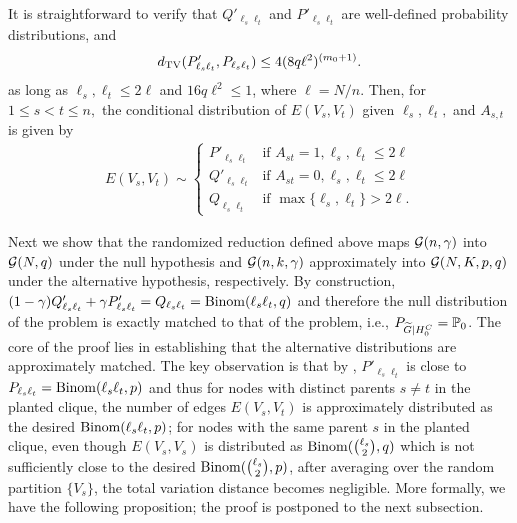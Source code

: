 It is straightforward to verify that $Q'_{\ell_s \ell_t}$ and $P'_{\ell_s \ell_t}$ are well-defined probability distributions, and
\begin{align}
d_{\rm TV} ( P'_{\ell_s \ell_t}, P_{\ell_s\ell_t} ) \le  4 (8q \ell^2)^{(m_0+1)}. \label{eq:TV_bound}
\end{align}
as long as $\ell_s, \ell_t \le 2 \ell$ and $16 q \ell^2 \le 1$, where $\ell=N/n$.  
Then, for $1\leq s < t \leq n,$ the conditional distribution of $E(V_s,V_t)$ given $\ell_s,\ell_t,$ and $A_{s,t}$ is given by
    \begin{align}
    E(V_s, V_t) \sim \left\{
    \begin{array}{rl}
    P'_{\ell_s \ell_t} & \text{if } A_{st}=1, \ell_s, \ell_t \le 2\ell\\
    Q'_{\ell_s \ell_t} & \text{if } A_{st}=0, \ell_s, \ell_t \le 2 \ell \\
    Q_{\ell_s \ell_t} & \text{if } \max\{ \ell_s, \ell_t \}> 2 \ell.
    \end{array} \right. \label{eq:edgedist}
    \end{align}
   
   
Next we show that the randomized reduction defined above maps ${\mathcal{G}}(n,\gamma)$ into ${\mathcal{G}}(N,q)$ under the null hypothesis and ${\mathcal{G}}(n,k,\gamma)$ approximately  into ${\mathcal{G}}(N,K,p,q)$ under the alternative hypothesis, respectively.
By construction, $(1-\gamma) Q'_{\ell_s \ell_t}+ \gamma P'_{\ell_s \ell_t} = Q_{\ell_s \ell_t}= {\rm Binom}(\ell_s \ell_t,q)$ and therefore the null distribution of the \PC problem is exactly matched to that of the \PDS problem, i.e., $P_{{\widetilde{G}}|H_0^C}=\mathbb{P}_0$.
The core of the proof lies in establishing that the alternative distributions are approximately matched.
The key observation is that by , $P'_{\ell_s \ell_t}$ is close to $P_{\ell_s \ell_t}= {\rm Binom}(\ell_s \ell_t,p)$ and thus for nodes with distinct parents $s \neq t$ in the planted clique, the number of edges $E(V_s,V_t)$ is approximately distributed as the desired ${\rm Binom}(\ell_s \ell_t,p)$; for nodes with the same parent $s$ in the planted clique, even though $E(V_s,V_s)$ is distributed as ${\rm Binom}(\binom{\ell_s}{2},q)$ which is not sufficiently close to the desired ${\rm Binom}(\binom{\ell_s}{2},p)$, after averaging over the random partition $\{V_s\}$, the total variation distance becomes negligible.  More formally, we have the following proposition; the proof is postponed to
the next subsection.

